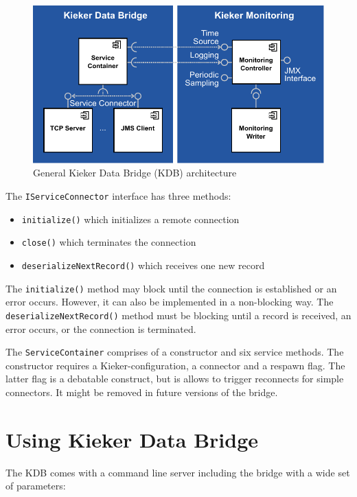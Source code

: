 \documentclass[11pt,a4paper]{article}
\begin{document}
\begin{figure}[htb]
\includegraphics[width=\textwidth]{images/kieker-data-bridge.pdf}
\caption{General Kieker Data Bridge (KDB) architecture}
\label{fig:kdb-arch}
\end{figure}

The \texttt{IServiceConnector} interface has three methods:

\begin{itemize}
\item \texttt{initialize()} which initializes a remote connection
\item \texttt{close()} which terminates the connection
\item \texttt{deserializeNextRecord()} which receives one new record
\end{itemize}

The \texttt{initialize()} method may block until the connection is established or an error occurs. However, it can also be implemented in a non-blocking way. The \texttt{deserializeNextRecord()} method must be blocking until a record is received, an error occurs, or the connection is terminated.

The \texttt{ServiceContainer} comprises of a constructor and six service methods. The constructor requires a Kieker-configuration, a connector and a respawn flag. The latter flag is a debatable construct, but is allows to trigger reconnects for simple connectors. It might be removed in future versions of the bridge.

\section{Using Kieker Data Bridge}\label{s:using-kdb}

The KDB comes with a command line server including the bridge with a wide set of parameters:
\end{document}
